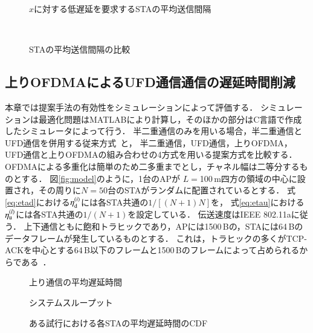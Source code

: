 \documentclass[master]{kuisthesis}		%
\begin{document}
			\begin{figure}[t]
				\centering
				\caption{$x$に対する低遅延を要求するSTAの平均送信間隔}
				\label{fig:chnx}
			\end{figure}

			\begin{figure}[t]
				\centering
				\\
				\caption{STAの平均送信間隔の比較}
				\label{fig:inter}
			\end{figure}

	\subsection{上りOFDMAによるUFD通信通信の遅延時間削減}
		本章では提案手法の有効性をシミュレーションによって評価する．
		シミュレーションは最適化問題はMATLABにより計算し，そのほかの部分はC言語で作成したシミュレータによって行う．
		半二重通信のみを用いる場合，半二重通信とUFD通信を併用する従来方式~\cite{promac_fair}と，
		半二重通信，UFD通信，上りOFDMA，UFD通信と上りOFDMAの組み合わせの4方式を用いる提案方式を比較する．
		OFDMAによる多重化は簡単のため二多重までとし，チャネル幅は二等分するものとする．
		図\ref{fig:model}のように，1台のAPが $L=$100\,m四方の領域の中心に設置され，その周りに$N=50$台のSTAがランダムに配置されているとする．
		式\eqref{eq:etad}における$\eta_{\rm d}^{(i)}$には各STA共通の$1/[(N+1)N]$を，
		式\eqref{eq:etau}における$\eta_{\rm u}^{(l)}$には各STA共通の$1/(N+1)$を設定している．
		伝送速度はIEEE 802.11aに従う．
		上下通信ともに飽和トラヒックであり，APには1500\,Bの，STAには64\,Bのデータフレームが発生しているものとする．
		これは，トラヒックの多くがTCP-ACKを中心とする64\,B以下のフレームと1500\,Bのフレームによって占められるからである~\cite{traffic}．

		\begin{figure}[t]
			\centering
			\caption{上り通信の平均遅延時間}
			\label{fig:delay}
		\end{figure}
		\begin{figure}[t]
			\centering
			\caption{システムスループット}
			\label{fig:thr}
		\end{figure}
		\begin{figure}[t]
			\centering
			\caption{ある試行における各STAの平均遅延時間のCDF}
			\label{fig:cdf}
		\end{figure}
\end{document}
